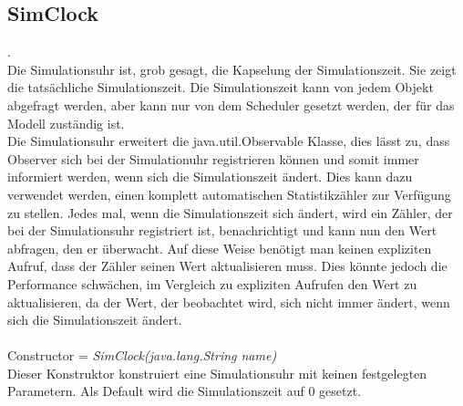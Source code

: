 \documentclass[runningheads]{llncs}
\begin{document}
\subsection{SimClock}
.\\
Die Simulationsuhr ist, grob gesagt, die Kapselung der Simulationszeit. Sie zeigt die tatsächliche Simulationszeit. Die Simulationszeit kann von jedem Objekt abgefragt werden, aber kann nur von dem Scheduler gesetzt werden, der für das Modell zuständig ist.\\
Die Simulationsuhr erweitert die java.util.Observable Klasse, dies lässt zu, dass Observer sich bei der Simulationuhr registrieren können und somit immer informiert werden, wenn sich die Simulationszeit ändert. Dies kann dazu verwendet werden, einen komplett automatischen Statistikzähler zur Verfügung zu stellen. Jedes mal, wenn die Simulationszeit sich ändert, wird ein Zähler, der bei der Simulationsuhr registriert ist, benachrichtigt und kann nun den Wert abfragen, den er überwacht. Auf diese Weise benötigt man keinen expliziten Aufruf, dass der Zähler seinen Wert aktualisieren muss. Dies könnte jedoch die Performance schwächen, im Vergleich zu expliziten Aufrufen den Wert zu aktualisieren, da der Wert, der beobachtet wird, sich nicht immer ändert, wenn sich die Simulationszeit ändert.\\
 \\
Constructor = \textit{SimClock(java.lang.String name)}\\
Dieser Konstruktor konstruiert eine Simulationsuhr mit keinen festgelegten Parametern. Als Default wird die Simulationszeit auf 0 gesetzt.\\
\end{document}
